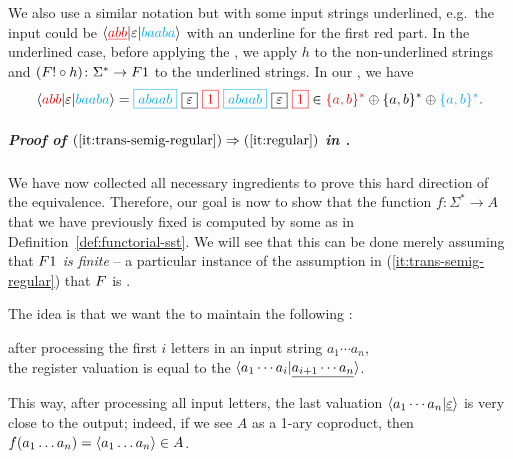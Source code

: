 We also use a similar notation but with some input strings underlined, e.g.~the input could be $\langle {\color{red}\underline{abb}} | \varepsilon | {\color{cyan}baaba} \rangle$ with an underline for the first red part. In the underlined case, before applying the , we apply $h$ to the non-underlined strings and
$(\functor! \circ h) \colon \Sigma^* \to \functor1$
to the underlined strings. In our , we have
\begin{align*}
  \tuple{\red{abb} | \varepsilon | \blue{baaba}} =  
  \blue{\boxed{abaab}} \ 
  \boxed{\varepsilon} \ 
  \red{\boxed{1}} \ 
  \blue{\boxed{abaab}} \
  \boxed{\varepsilon} \
  \red{\boxed{1}}
  \in \red{\set{a,b}^*} \oplus \set{a,b}^*  \oplus \blue{\set{a,b}^*}.
\end{align*}

\subparagraph*{Proof of $(\ref{it:trans-semig-regular}) \Rightarrow (\ref{it:regular})$ in .}
We have now collected all necessary ingredients to prove this hard direction of
the equivalence. Therefore, our goal is now to show that the function $f\colon
\Sigma^* \to A$ that we have previously fixed is computed by some  as in Definition~\ref{def:functorial-sst}.
We will see that this can be done merely assuming that \emph{$\functor 1$ is finite} -- a particular instance of the assumption in (\ref{it:trans-semig-regular}) that $\functor$ is .

The idea is that we want the \functorialsst to maintain the following : 
\begin{center}
  after processing the first $i$ letters in an input string $a_1 \cdots a_n$,\\ the register valuation is equal to the \kl{factorized output} $\langle a_1 \cdots a_i | \underline{a_{i+1} \cdots a_n} \rangle$.  
\end{center}
 This way, after processing all input letters, the last valuation $\langle a_1 \cdots a_n | \underline{\varepsilon} \rangle$ is very close to the output; indeed, if we see $A$ as a 1-ary coproduct, then $f(a_1\dots a_n) = \langle a_1 \dots a_n \rangle \in A$.

